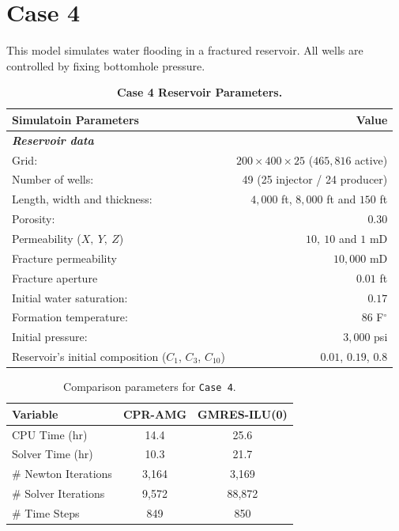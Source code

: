 \section{Case 4}
This model simulates water flooding in a fractured reservoir. All wells are controlled by fixing bottomhole pressure.
\FloatBarrier
\begin{center}
\begin{table}[h!]
\begin{adjustbox}{width=0.7\textwidth}
    \begin{threeparttable}
    \caption{\textbf{Case 4 Reservoir Parameters\supercite{phdfernandes}.}}
    \label{case8}
        \begin{tabular}{l r }
            \toprule
            Simulatoin Parameters & Value\\
            \midrule
	\rowcolor{red!20}\textit{\textbf{Reservoir data}}      & \\
	Grid:      &           $200\times400\times25$ ($465,816$ active) \\
	\rowcolor{blue!5}Number of wells:      &  49 (25 injector / 24 producer) \\
	Length, width and thickness:      & $4,000$ ft, $8,000$ ft and $150$ ft\\
	\rowcolor{blue!5}Porosity:       &          $0.30$ \\
	Permeability ($X, \ Y, \ Z$) & $10, \ 10$ and $1$ mD\\
	\rowcolor{blue!5}Fracture permeability & $10,000$ mD\\
	Fracture aperture	& $0.01$ ft\\
	\rowcolor{blue!5}Initial water saturation:    & $0.17$ \\      
	Formation temperature:    & $86$ F$^{\circ}$     \\
	\rowcolor{blue!5}Initial pressure:    &      $3,000$ psi\\
	Reservoir’s initial composition ($C_{1}$, $C_{3}$, $C_{10}$) & $0.01$, $0.19$, $0.8$\\
        \bottomrule
        \end{tabular}
    \end{threeparttable}
\end{adjustbox}    
\end{table}
\end{center}
\FloatBarrier

\begin{table}[h!]
   \caption{Comparison parameters for \texttt{Case 4}.}
   \label{case8-tab}
   \small
   \centering
   \begin{tabular}{lcc}
   \toprule\toprule
   \textbf{Variable} & \textbf{CPR-AMG} & \textbf{GMRES-ILU(0)} \\
   \midrule
   CPU Time (hr) & 14.4 & 25.6 \\
   Solver Time (hr) & 10.3 & 21.7 \\
   \# Newton Iterations & 3,164 & 3,169 \\
   \# Solver Iterations & 9,572 & 88,872 \\
   \# Time Steps & 849 & 850 \\
   \bottomrule
   \end{tabular}
\end{table}

